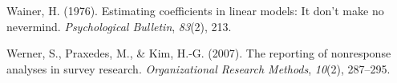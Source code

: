 \documentclass[
  man,mask]{apa7}
\newlength{\cslhangindent}
\newlength{\cslentryspacingunit} %
\newenvironment{CSLReferences}[2] %
 {%
  \setlength{\parindent}{0pt}
  \ifodd #1
  \let\oldpar\par
  \def\par{\hangindent=\cslhangindent\oldpar}
  \fi
  \setlength{\parskip}{#2\cslentryspacingunit}
 }%
 {}
\begin{document}
\begin{CSLReferences}{1}{0}
\leavevmode{}%
Wainer, H. (1976). Estimating coefficients in linear models: It don't make no nevermind. \emph{Psychological Bulletin}, \emph{83}(2), 213.

\leavevmode{}%
Werner, S., Praxedes, M., \& Kim, H.-G. (2007). The reporting of nonresponse analyses in survey research. \emph{Organizational Research Methods}, \emph{10}(2), 287--295.

\end{CSLReferences}

\endgroup
\end{document}
